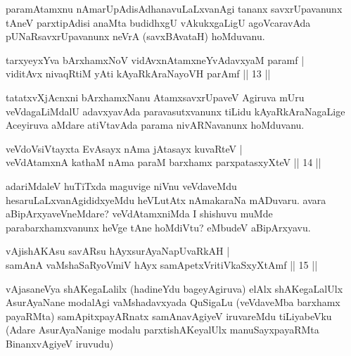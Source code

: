 \begin{artha}
paramAtamxnu nAmarUpAdisAdhanavuLaLxvanAgi tananx savxrUpavanunx 
tAneV parxtipAdisi anaMta budidhxgU vAkukxgaLigU agoVcaravAda 
pUNaRsavxrUpavanunx neVrA (savxBAvataH) hoMduvanu.
\end{artha}

\begin{shl}
tarxyeyxYva bArxhamxNoV vidAvxnAtamxneYvAdavxyaM paramf | \\
viditAvx nivaqRtiM yAti kAyaRkAraNayoVH parAmf \hfill||  13 ||  
\end{shl}

\begin{artha}
tatatxvXjAcnxni bArxhamxNanu AtamxsavxrUpaveV Agiruva mUru 
veVdagaLiMdalU adavxyavAda paravasutxvanunx tiLidu kAyaRkAraNagaLige 
Aceyiruva aMdare atiVtavAda parama nivARNavanunx hoMduvanu.
\end{artha}


\begin{shl}
veVdoV\s siVtayxta EvAsayx nAma jAtasayx kuvaRteV | \\
veVdAtamxnA kathaM nAma paraM barxhamx parxpatasxyXteV \hfill||  14 ||  
\end{shl}

\begin{artha}
adariMdaleV huTiTxda maguvige niVnu veVdaveMdu 
hesaruLaLxvanAgididxyeMdu heVLutAtx nAmakaraNa mADuvaru. avara 
aBipArxyaveVneMdare? veVdAtamxniMda I shishuvu muMde 
parabarxhamxvanunx heVge tAne hoMdiVtu? eMbudeV aBipArxyavu.
\end{artha}


\begin{shl}
vAjishAKAsu savARsu hAyxsurAyaNapUvaRkAH | \\
samAnA vaMshaSaRyoV\s miV hAyx samApetxVritiVkaSxyXtAmf \hfill||  15 ||  
\end{shl}

\begin{artha}
vAjasaneVya shAKegaLalilx (hadineYdu bageyAgiruva) elAlx shAKegaLalUlx AsurAyaNane modalAgi vaMshadavxyada QuSigaLu (veVdaveMba barxhamx payaRMta) samApitxpayARnatx samAnavAgiyeV iruvareMdu tiLiyabeVku (Adare AsurAyaNanige modalu parxtishAKeyalUlx manuSayxpayaRMta BinanxvAgiyeV iruvudu)
\end{artha}

